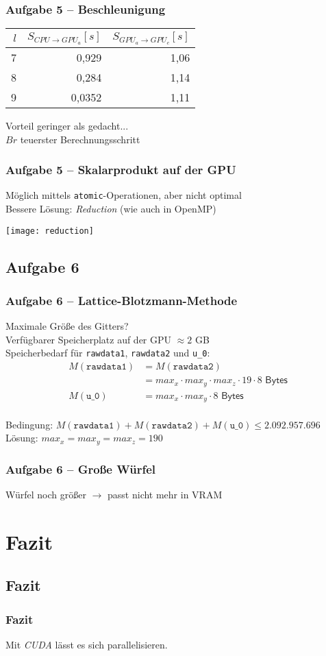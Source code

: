 \documentclass[german,notes,18pt]{beamer}
\begin{document}
	\begin{frame}
		\frametitle{Aufgabe 5 -- Beschleunigung}
		\begin{center}
			\begin{tabular}{r|r|r}
			$l$ & $S_{CPU\rightarrow GPU_a}[s]$ & $S_{GPU_a\rightarrow GPU_c}[s]$ \\
			\hline
			7 & 0,929 & 1,06 \\
			8 & 0,284 & 1,14 \\
			9 & 0,0352 & 1,11
		\end{tabular}
		\end{center}
		Vorteil geringer als gedacht...\\
		$Br$ teuerster Berechnungsschritt
	\end{frame}
	\begin{frame}
		\frametitle{Aufgabe 5 -- Skalarprodukt auf der GPU}
		Möglich mittels \texttt{atomic}-Operationen, aber nicht optimal \\
		\vspace{2em}
		Bessere Lösung: \emph{Reduction} (wie auch in OpenMP)
		\begin{center}
			\texttt{[image: reduction]}
		\end{center}
	\end{frame}

	\subsection{Aufgabe 6}
	\begin{frame}
		\frametitle{Aufgabe 6 -- Lattice-Blotzmann-Methode}
		Maximale Größe des Gitters? \\
		Verfügbarer Speicherplatz auf der GPU $\approx2$ GB \\
		\vspace{2em}
		\pause
		Speicherbedarf für \texttt{rawdata1}, \texttt{rawdata2} und \texttt{u\_0}:
		\begin{equation*}
		\begin{split}
		M(\mathtt{rawdata1})&=M(\mathtt{rawdata2})\\
		&=max_x\cdot max_y\cdot max_z\cdot 19\cdot8\textsf{ Bytes} \\
		M(\mathtt{u\_0})&=max_x\cdot max_y\cdot 8\textsf{ Bytes}
		\end{split}
		\end{equation*}\\
		\vspace{2em}
		\pause
		Bedingung: $M(\mathtt{rawdata1})+M(\mathtt{rawdata2})+M(\mathtt{u\_0})\leq2.092.957.696$ \\
		Lösung: $max_x=max_y=max_z=190$
	\end{frame}
	\begin{frame}
		\frametitle{Aufgabe 6 -- Große Würfel}
		Würfel noch größer $\rightarrow$ passt nicht mehr in VRAM
	\end{frame}

	
	\section{Fazit}
	\subsection{Fazit}
	\begin{frame}
		\frametitle{Fazit}
		
		\LARGE
		\centering
		Mit \emph{CUDA} lässt es sich parallelisieren.
	\end{frame}
\end{document}
